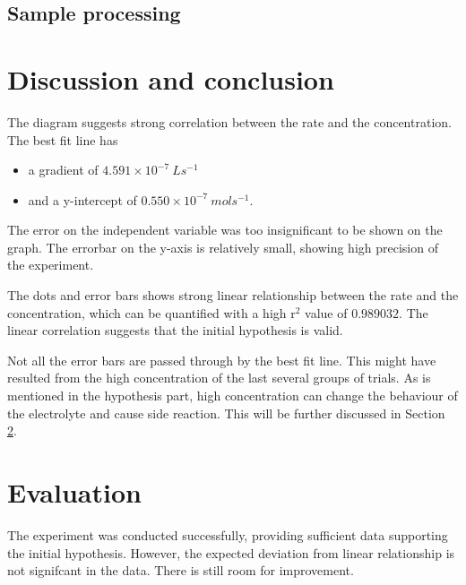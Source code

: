 \documentclass[a4paper]{article}
\begin{document}
\subsection{Sample processing}

\section{Discussion and conclusion}

The diagram suggests strong correlation between the rate and the concentration. The best fit line has 

\begin{itemize}
    \item a gradient of $4.591 \times 10^{-7}\SI{}{L s^{-1}}$
    \item and a y-intercept of $0.550\times 10^{-7} \SI{}{mol s^{-1}}$.
\end{itemize}

The error on the independent variable was too insignificant to be shown on the graph. The errorbar on the y-axis is relatively small, showing high precision of the experiment.

The dots and error bars shows strong linear relationship between the rate and the concentration, which can be quantified with a high r$^2$ value of $0.989032$. The linear correlation suggests that the initial hypothesis is valid.

Not all the error bars are passed through by the best fit line. This might have resulted from the high concentration of the last several groups of trials. As is mentioned in the hypothesis part, high concentration can change the behaviour of the electrolyte and cause side reaction. This will be further discussed in Section \ref{sec.eval}.

\section{Evaluation}
\label{sec.eval}

The experiment was conducted successfully, providing sufficient data supporting the initial hypothesis. However, the expected deviation from linear relationship is not signifcant in the data. There is still room for improvement.
\end{document}
